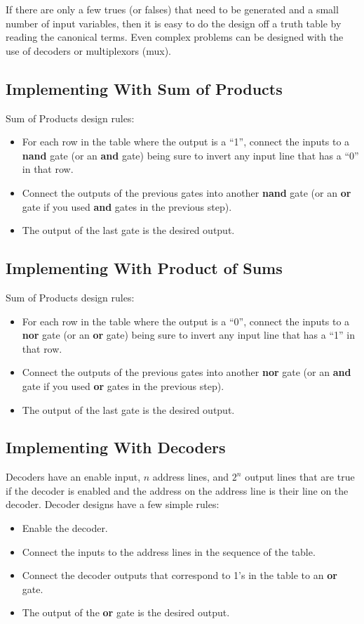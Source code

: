 If there are only a few trues (or falses) that need to be generated and a small number of input variables, then it is easy to do the design off a truth table by reading the canonical terms.  Even complex problems can be designed with the use of decoders or multiplexors (mux).

\subsection{Implementing With Sum of Products}

Sum of Products design rules:
\begin{itemize}
    \item For each row in the table where the output is a ``1'', connect the inputs to a \textbf{nand} gate (or an \textbf{and} gate) being sure to invert any input line that has a ``0'' in that row.
    \item Connect the outputs of the previous gates into another \textbf{nand} gate (or an \textbf{or} gate if you used \textbf{and} gates in the previous step).
    \item The output of the last gate is the desired output.
\end{itemize}

\subsection{Implementing With Product of Sums}

Sum of Products design rules:
\begin{itemize}
    \item For each row in the table where the output is a ``0'', connect the inputs to a \textbf{nor} gate (or an \textbf{or} gate) being sure to invert any input line that has a ``1'' in that row.
    \item Connect the outputs of the previous gates into another \textbf{nor} gate (or an \textbf{and} gate if you used \textbf{or} gates in the previous step).
    \item The output of the last gate is the desired output.
\end{itemize}

\subsection{Implementing With Decoders}

Decoders have an enable input, $n$ address lines, and $2^n$ output lines that are true if the decoder is enabled and the address on the address line is their line on the decoder.  Decoder designs have a few simple rules:
\begin{itemize}
    \item Enable the decoder.
    \item Connect the inputs to the address lines in the sequence of the table.
    \item Connect the decoder outputs that correspond to 1's in the table to an \textbf{or} gate.
    \item The output of the \textbf{or} gate is the desired output.
\end{itemize}

